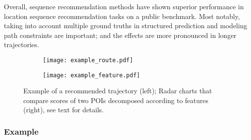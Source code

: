 Overall, sequence recommendation methods have shown superior performance in location sequence recommendation tasks on a public benchmark. Most notably, taking into account multiple ground truths in structured prediction and modeling path constraints are important; and the effects are more pronounced in longer trajectories.





\begin{figure}[htbp]
    \centering
    \begin{subfigure}[t]{.47\linewidth} %
        \centering
        \texttt{[image: example\_route.pdf]}
    \end{subfigure}
    \quad
    \begin{subfigure}[t]{.47\linewidth} 
        \centering
        \texttt{[image: example\_feature.pdf]}
    \end{subfigure}
    \caption{Example of a recommended trajectory (left); Radar charts that compare scores of two POIs decomposed according to features (right), see text for details.}
    \label{fig:example}
\end{figure}

\subsubsection{Example}
\label{sec:example}

